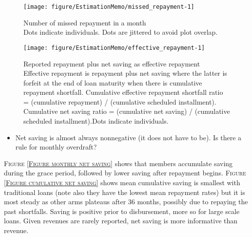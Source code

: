 \begin{Schunk}
\begin{figure}

{\centering \texttt{[image: figure/EstimationMemo/missed\_repayment-1]} 

}

\caption{Number of missed repayment in a month\\ {\footnotesize Dots indicate individuals. Dots are jittered to avoid plot overlap. \setlength{\baselineskip}{8pt}}}\label{Figure missed repayment}
\end{figure}
\end{Schunk}
\begin{Schunk}
\begin{figure}

{\centering \texttt{[image: figure/EstimationMemo/effective\_repayment-1]} 

}

\caption{Reported repayment plus net saving as effective repayment\\ {\footnotesize Effective repayment is repayment plus net saving where the latter is forfeit at the end of loan maturity when there is cumulative repayment shortfall. Cumulative effective repayment shortfall ratio = (cumulative repayment) / (cumulative scheduled installment). Cumulative net saving ratio = (cumulative net saving) / (cumulative scheduled installment).Dots indicate individuals.  \setlength{\baselineskip}{8pt}}}\label{Figure effective repayment}
\end{figure}
\end{Schunk}
\begin{itemize}
\vspace{1.0ex}\setlength{\itemsep}{1.0ex}\setlength{\baselineskip}{12pt}
\item	Net saving is almost always nonnegative (it does not have to be). Is there a rule for monthly overdraft?
\end{itemize}
\begin{palepinkleftbar}
\begin{finding}
\textsc{\small Figure \ref{Figure monthly net saving}} shows that members accumulate saving during the grace period, followed by lower saving after repayment begins.  \textsc{\small Figure \ref{Figure cumulative net saving}} shows mean cumulative saving is smallest with traditional loans (note also they have the lowest mean repayment rates) but it is most steady as other arms plateaus after 36 months, possibly due to repaying the past shortfalls. Saving is positive prior to disbursement, more so for large scale loans. Given revenues are rarely reported, net saving is more informative than revenue.
\end{finding}
\end{palepinkleftbar}

